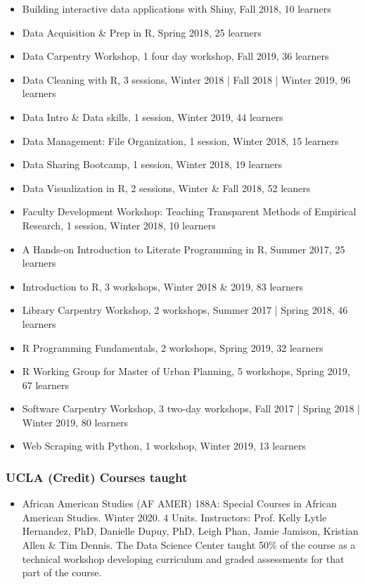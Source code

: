 \begin{itemize}[label={}, leftmargin=!,labelindent=5pt,itemindent=-15pt]
  \item Building interactive data applications with Shiny, Fall 2018,	10 learners
  \item Data Acquisition \& Prep in R, Spring 2018, 25 learners
  \item Data Carpentry Workshop, 1 four day workshop, Fall 2019,	36 learners
  \item Data Cleaning with R,	3 sessions,	Winter 2018 | Fall 2018 | Winter 2019, 96 learners
  \item Data Intro \& Data skills, 1 session, Winter 2019,	44 learners
  \item Data Management: File Organization,	1 session, Winter 2018,	15 learners
  \item Data Sharing Bootcamp, 1 session, Winter 2018, 19 learners
  \item Data Visualization in R, 2 sessions, Winter \& Fall 2018, 52 leaners
  \item Faculty Development Workshop: Teaching Transparent Methods of Empirical Research, 1 session, Winter 2018,	10 learners
  \item A Hands-on Introduction to Literate Programming in R, Summer 2017, 25 learners
  \item Introduction to R, 3 workshops, Winter 2018 \& 2019, 83 learners
  \item Library Carpentry Workshop, 2 workshops, Summer 2017 | Spring 2018, 46 learners
  \item R Programming Fundamentals,	2 workshops,	Spring 2019, 32 learners
  \item R Working Group for Master of Urban Planning, 5 workshops, Spring 2019,	67 learners
  \item Software Carpentry Workshop, 3 two-day workshops, Fall 2017 | Spring 2018 | Winter 2019, 80 learners
  \item Web Scraping with Python,	1	workshop, Winter 2019, 13 learners
\end{itemize}

\subsubsection{UCLA (Credit) Courses taught}

\begin{itemize}[label={},leftmargin=!,labelindent=5pt,itemindent=-15pt]
    \item African American Studies (AF AMER) 188A: Special Courses in African American Studies. Winter 2020. 4 Units. Instructors: Prof. Kelly Lytle Hernandez, PhD, Danielle Dupuy, PhD, Leigh Phan, Jamie Jamison, Kristian Allen \& Tim Dennis. The Data Science Center taught 50\% of the course as a technical workshop developing curriculum and graded assessments for that part of the course.
\end{itemize}

